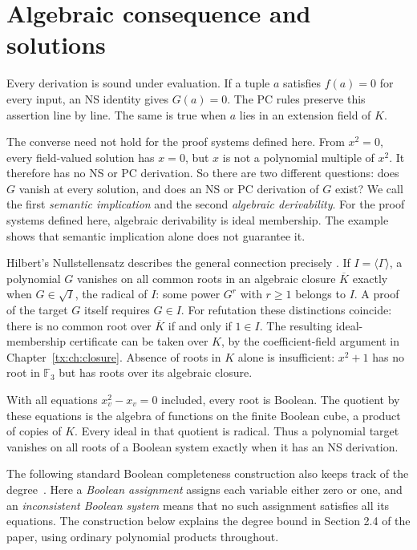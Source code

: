 \section{Algebraic consequence and solutions}
Every derivation is sound under evaluation. If a tuple $a$ satisfies
$f(a)=0$ for every input, an NS identity gives $G(a)=0$. The PC rules
preserve this assertion line by line. The same is true when $a$ lies
in an extension field of $K$.

The converse need not hold for the proof systems defined here. From
$x^2=0$, every field-valued solution has $x=0$, but $x$ is not a
polynomial multiple of $x^2$. It therefore has no NS or PC derivation.
So there are two different questions: does $G$ vanish at every solution,
and does an NS or PC derivation of $G$ exist? We call the first
\emph{semantic implication} and the second \emph{algebraic derivability}.
For the proof systems defined here, algebraic derivability is ideal
membership. The example shows that semantic implication alone does not
guarantee it.

Hilbert's Nullstellensatz describes the general connection precisely
\cite{LangAlgebra}. If $I=\langle\Gamma\rangle$, a polynomial $G$
vanishes on all common roots in an algebraic closure $\overline K$
exactly when $G\in\sqrt I$, the radical of $I$: some power $G^r$
with $r\ge1$ belongs to $I$. A proof of the target $G$ itself requires
$G\in I$. For refutation these distinctions coincide: there is no
common root over $\overline K$ if and only if $1\in I$.
The resulting ideal-membership certificate can be taken over $K$,
by the coefficient-field argument in Chapter~\ref{tx:ch:closure}.
Absence of roots in $K$ alone is insufficient: $x^2+1$ has no root
in $\mathbb F_3$ but has roots over its algebraic closure.

With all equations $x_v^2-x_v=0$ included, every root is Boolean.
The quotient by these equations is the algebra of functions on the
finite Boolean cube, a product of copies of $K$. Every ideal in that
quotient is radical. Thus a polynomial target vanishes on all roots
of a Boolean system exactly when it has an NS derivation.

The following standard Boolean completeness construction also keeps
track of the degree~\cite{NSFoundations}. Here a
\emph{Boolean assignment} assigns each variable either zero or one, and
an \emph{inconsistent Boolean system} means that no such assignment
satisfies all its equations. The construction below explains the degree bound in Section 2.4
of the paper, using ordinary polynomial products throughout.

